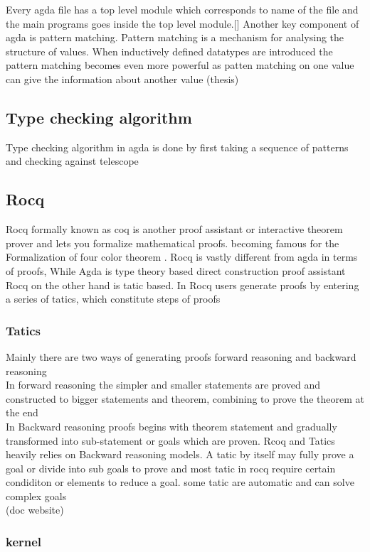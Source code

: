 \documentclass[12pt]{article}
\begin{document}
Every agda file has a top level module which corresponds to name of the file and the main programs goes inside the top level module.[]
Another key component of agda is pattern matching. Pattern matching is a mechanism for analysing the structure of values. When inductively defined  datatypes are introduced the
pattern matching becomes even more powerful as patten matching on one value can give the information about another value (thesis) 


\subsection{ Type checking algorithm}
Type checking algorithm in agda is done by first taking a sequence of patterns and checking against telescope  
\subsection{Rocq}
Rocq formally known as coq is another proof assistant or interactive theorem prover and lets you formalize mathematical proofs. becoming famous for the Formalization of four color theorem  .
Rocq is vastly different from agda in terms of proofs, While Agda is type theory based direct construction proof assistant Rocq on the other hand is tatic based. 
In Rocq users generate proofs by entering a series of tatics, which constitute steps of proofs
\subsubsection{Tatics}
    Mainly there are two ways of generating proofs forward reasoning and backward reasoning  \\ 
    In forward reasoning the simpler and smaller statements are proved and constructed to bigger statements and theorem, combining to prove the theorem at the end \\
    In Backward reasoning proofs begins with theorem statement and gradually transformed into sub-statement or goals which are proven. 
    Rcoq and Tatics heavily relies on Backward reasoning models.
    A tatic by itself may fully prove a goal or divide into sub goals to prove and most tatic in rocq require certain condiditon or elements to reduce a goal.
    some tatic are automatic and can solve complex goals\\ (doc website)
    \subsubsection{kernel}
\end{document}
